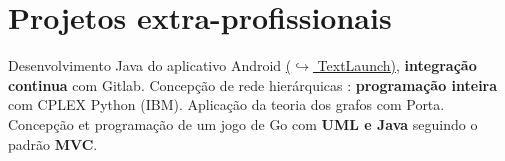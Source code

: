 \documentclass[10pt,a4paper,sans]{moderncv}%
\begin{document}

\section{Projetos extra-profissionais}
    {Desenvolvimento Java do aplicativo Android \href{https://gitlab.com/MisterFruits/TextLaunch}{($\hookrightarrow$ TextLaunch)}, \textbf{integração continua} com Gitlab.}
    {Concepção de rede hierárquicas : \textbf{programação inteira} com CPLEX Python (IBM). Aplicação da teoria dos grafos com Porta.}
    {Concepção et programação de um jogo de Go com \textbf{UML e Java} seguindo o padrão \textbf{MVC}.}
\end{document}
